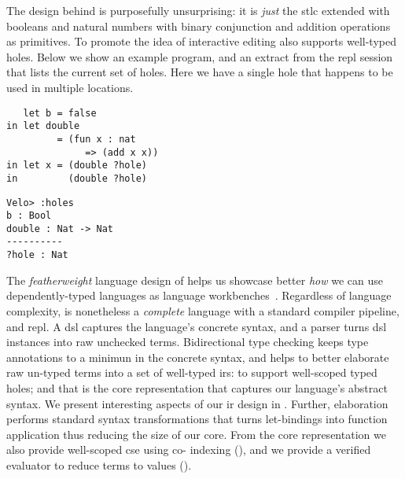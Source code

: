 The design behind \Velo{} is purposefully unsurprising:
%
it is \emph{just} the \ac{stlc} extended with booleans and natural numbers with binary conjunction and addition operations as primitives.
%
To promote the idea of interactive editing \Velo{} also supports well-typed holes.
%
Below we show an example \Velo{} program, and an extract from the \acs*{repl}
session that lists the current set of holes. Here we have a single hole that
happens to be used in multiple locations.

\begin{center}
  \begin{minipage}[t]{0.45\linewidth}
\begin{Verbatim}
   let b = false
in let double
         = (fun x : nat
              => (add x x))
in let x = (double ?hole)
in         (double ?hole)
\end{Verbatim}
\end{minipage}
\hfill
  \begin{minipage}[t]{0.45\linewidth}
    \begin{Verbatim}
Velo> :holes
b : Bool
double : Nat -> Nat
----------
?hole : Nat
\end{Verbatim}
\end{minipage}

\end{center}

The \emph{featherweight} language design of \Velo{} helps us showcase better \emph{how} we can use dependently-typed languages as language workbenches~\cite{DBLP:journals/toplas/IgarashiPW01}.
%
Regardless of language complexity, \Velo{} is nonetheless a \emph{complete} language with a standard compiler pipeline, and \acs*{repl}.
%
A \ac{dsl} captures the language's concrete syntax, and a parser turns \ac{dsl} instances into raw unchecked terms.
%
Bidirectional type checking keeps type annotations to a minimun in the concrete syntax, and helps to better elaborate raw un-typed terms into a set of well-typed \acp{ir}:
%
 to support well-scoped typed holes;
%
and
%
 that is the core representation that captures our language's abstract syntax.
%
We present interesting aspects of our \ac{ir} design in .
%
Further, elaboration performs standard syntax transformations that turns let-bindings into function application thus reducing the size of our core.
%
From the core representation we also provide well-scoped \ac{cse} using co-\DeBruijn{} indexing (), and we provide a verified evaluator to reduce terms to values ().

